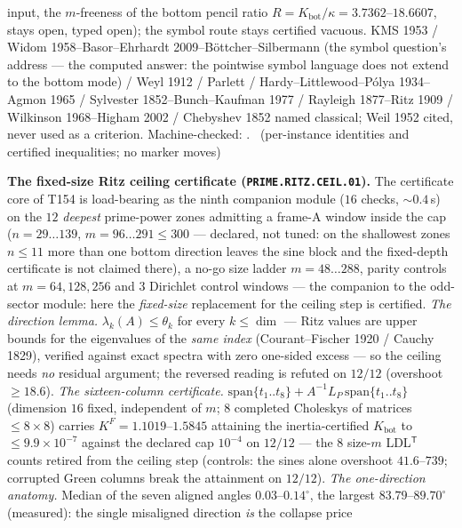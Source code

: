 \documentclass[11pt,a4paper]{article}
\theoremstyle{definition}
\begin{document}
input, the $m$-freeness of the bottom pencil ratio
$R=K_{\mathrm{bot}}/\kappa=3.7362$--$18.6607$, stays open, typed open);
the symbol route stays certified vacuous.
KMS 1953 / Widom 1958--Basor--Ehrhardt 2009--B\"ottcher--Silbermann (the
symbol question's address --- the computed answer: the pointwise symbol
language does not extend to the bottom mode) / Weyl 1912 / Parlett /
Hardy--Littlewood--P\'olya 1934--Agmon 1965 / Sylvester
1852--Bunch--Kaufman 1977 / Rayleigh 1877--Ritz 1909 / Wilkinson
1968--Higham 2002 / Chebyshev 1852 named classical; Weil 1952 cited, never
used as a criterion.
Machine-checked:
.
\mE\ (per-instance identities and certified inequalities; no marker moves)

\par\smallskip\noindent\textbf{The fixed-size Ritz ceiling certificate
(\texttt{PRIME.RITZ.CEIL.01}).}
The certificate core of T154 is load-bearing as the ninth companion module
($16$ checks, ${\sim}0.4$\,s) on the $12$ \emph{deepest} prime-power zones
admitting a frame-A window inside the cap ($n=29\ldots139$,
$m=96\ldots291\le300$ --- declared, not tuned: on the shallowest zones
$n\le11$ more than one bottom direction leaves the sine block and the
fixed-depth certificate is not claimed there), a no-go size ladder
$m=48\ldots288$, parity controls at $m=64,128,256$ and $3$ Dirichlet
control windows --- the companion to the odd-sector module: here the
\emph{fixed-size} replacement for the ceiling step is certified.
\emph{The direction lemma.} $\lambda_k(A)\le\theta_k$ for every
$k\le\dim$ --- Ritz values are upper bounds for the eigenvalues of the
\emph{same index} (Courant--Fischer 1920 / Cauchy 1829), verified against
exact spectra with zero one-sided excess --- so the ceiling needs
\emph{no} residual argument; the reversed reading is refuted on $12/12$
(overshoot $\ge18.6$).
\emph{The sixteen-column certificate.}
$\mathrm{span}\{t_1..t_8\}+A^{-1}L_P\,\mathrm{span}\{t_1..t_8\}$ (dimension
$16$ fixed, independent of $m$; $8$ completed Choleskys of matrices
$\le8\times8$) carries $K^F=1.1019$--$1.5845$ attaining the
inertia-certified $K_{\mathrm{bot}}$ to $\le9.9\times10^{-7}$ against the
declared cap $10^{-4}$ on $12/12$ --- the $8$ size-$m$
LDL$^{\mathsf T}$ counts retired from the ceiling step (controls: the
sines alone overshoot $41.6$--$739$; corrupted Green columns break the
attainment on $12/12$).
\emph{The one-direction anatomy.} Median of the seven aligned angles
$0.03$--$0.14^\circ$, the largest $83.79$--$89.70^\circ$ (measured): the
single misaligned direction \emph{is} the collapse price
\end{document}
